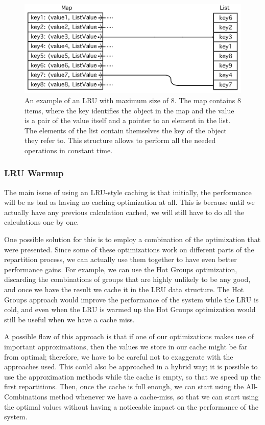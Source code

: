 \begin{figure}[!htb]
  \centering
  \includegraphics[width=\textwidth,height=\textheight,keepaspectratio]{img/lru.png}
  \caption{An example of an LRU with maximum size of 8. The map contains 8 items, where the key identifies the object in the map and the value is a pair of the value itself and a pointer to an element in the list. The elements of the list contain themselves the key of the object they refer to. This structure allows to perform all the needed operations in constant time. }
  \label{fig:lru}
\end{figure}

\subsubsection{LRU Warmup}\label{sec:warmup}
The main issue of using an LRU-style caching is that initially, the performance will be as bad as having no caching optimization at all. This is because until we actually have any previous calculation cached, we will still have to do all the calculations one by one. 

One possible solution for this is to employ a combination of the optimization that were presented. Since some of these optimizations work on different parts of the repartition process, we can actually use them together to have even better performance gains. For example, we can use the Hot Groups optimization, discarding the combinations of groups that are highly unlikely to be any good, and once we have the result we cache it in the LRU data structure. The Hot Groups approach would improve the performance of the system while the LRU is cold, and even when the LRU is warmed up the Hot Groups optimization would still be useful when we have a cache miss.

A possible flaw of this approach is that if one of our optimizations makes use of important approximations, then the values we store in our cache might be far from optimal; therefore, we have to be careful not to exaggerate with the approaches used. This could also be approached in a hybrid way; it is possible to use the approximation methods while the cache is empty, so that we speed up the first repartitions. Then, once the cache is full enough, we can start using the All-Combinations method whenever we have a cache-miss, so that we can start using the optimal values without having a noticeable impact on the performance of the system.


